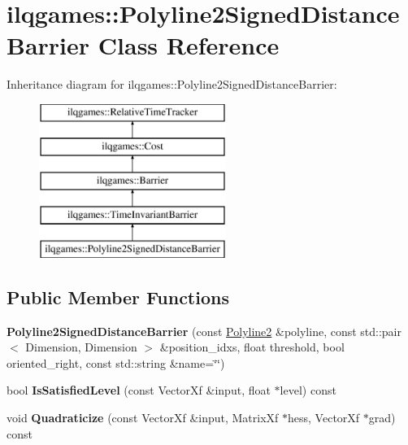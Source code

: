 \hypertarget{classilqgames_1_1_polyline2_signed_distance_barrier}{}\section{ilqgames\+:\+:Polyline2\+Signed\+Distance\+Barrier Class Reference}
\label{classilqgames_1_1_polyline2_signed_distance_barrier}
Inheritance diagram for ilqgames\+:\+:Polyline2\+Signed\+Distance\+Barrier\+:\begin{figure}[H]
\begin{center}
\leavevmode
\includegraphics[height=5.000000cm]{classilqgames_1_1_polyline2_signed_distance_barrier}
\end{center}
\end{figure}
\subsection*{Public Member Functions}
\begin{DoxyCompactItemize}
\item 
{\bfseries Polyline2\+Signed\+Distance\+Barrier} (const \hyperlink{classilqgames_1_1_polyline2}{Polyline2} \&polyline, const std\+::pair$<$ Dimension, Dimension $>$ \&position\+\_\+idxs, float threshold, bool oriented\+\_\+right, const std\+::string \&name=\char`\"{}\char`\"{})\hypertarget{classilqgames_1_1_polyline2_signed_distance_barrier_a6dc40fe72508a6a1bf702d2758d4f0e0}{}\label{classilqgames_1_1_polyline2_signed_distance_barrier_a6dc40fe72508a6a1bf702d2758d4f0e0}

\item 
bool {\bfseries Is\+Satisfied\+Level} (const Vector\+Xf \&input, float $\ast$level) const \hypertarget{classilqgames_1_1_polyline2_signed_distance_barrier_a802beaa3683eaa7859bbb7459d6ccd1b}{}\label{classilqgames_1_1_polyline2_signed_distance_barrier_a802beaa3683eaa7859bbb7459d6ccd1b}

\item 
void {\bfseries Quadraticize} (const Vector\+Xf \&input, Matrix\+Xf $\ast$hess, Vector\+Xf $\ast$grad) const \hypertarget{classilqgames_1_1_polyline2_signed_distance_barrier_a8205e41c8a1e2e2f4712695b42436339}{}\label{classilqgames_1_1_polyline2_signed_distance_barrier_a8205e41c8a1e2e2f4712695b42436339}

\end{DoxyCompactItemize}
